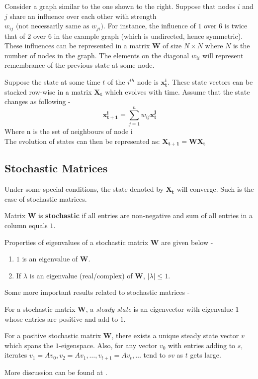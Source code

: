 \documentclass[12pt]{article}
\begin{document}
Consider a graph similar to the one shown to the right. Suppose that nodes $i$ and $j$ share an influence over each other with strength $w_{ij} \text{ (not necessarily same as }w_{ji})$. For instance, the influence of $1$ over $6$ is twice that of $2$ over $6$ in the example graph (which is undirected, hence symmetric). These influences can be represented in a matrix $\mathbf{W}$ of size $N\times N$ where $N$ is the number of nodes in the graph. The elements on the diagonal $w_{ii}$  will represent remembrance of the previous state at some node.

Suppose the state at some time $t$ of the $i^{th}$ node is $\mathbf{x_t^i}$. These state vectors can be stacked row-wise in a matrix $\mathbf{X_t}$ which evolves with time. Assume that the state changes as following -
\[\mathbf{x_{t+1}^i} = {\sum_{j=1}^{n}w_{ij}\mathbf{x_{t}^j}}\]
Where n is the set of neighbours of node i\\
The evolution of states can then be represented as: $\mathbf{X_{t+1}} = \mathbf{W}\mathbf{X_t}$

\subsection{Stochastic Matrices}
Under some special conditions, the state denoted by $\mathbf{X_t}$ will converge. Such is the case of stochastic matrices.
\begin{definition}
Matrix $\mathbf{W}$ is \textbf{stochastic} if all entries are non-negative and sum of all entries in a column equals $1$. %
\end{definition}
\begin{lemma}Properties of eigenvalues of a stochastic matrix $\mathbf{W}$ are given below -
\begin{enumerate}
    \item $1$ is an eigenvalue of $\mathbf{W}$.
    \item If $\lambda$ is an eigenvalue (real/complex) of $\mathbf{W}$, $|\lambda|\leq1$.
\end{enumerate}
\end{lemma}
\noindent Some more important results related to stochastic matrices -
\begin{definition}
For a stochastic matrix $\mathbf{W}$, a \textit{steady state} is an eigenvector with eigenvalue $1$ whose entries are positive and add to $1$.
\end{definition}
\begin{theorem}
For a positive stochastic matrix $\mathbf{W}$, there exists a unique steady state vector $v$ which spans the $1$-eigenspace. Also, for any vector $v_0$ with entries adding to $s$, iterates $v_1=Av_0, v_2=Av_1,\dots,v_{t+1}=Av_t,\dots$ tend to $sv$ as $t$ gets large.
\end{theorem}
\noindent More discussion can be found at \cite{interactivelinalg}.
\end{document}
